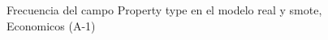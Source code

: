 \begin{figure}[H]
    \centering
    
    \caption{Frecuencia del campo Property type en el modelo real y smote, Economicos (A-1)}
    \label{frecuency-Property Type-smote-enc}
\end{figure}